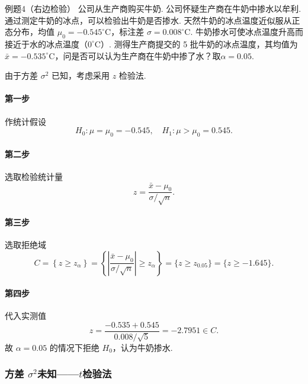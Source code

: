\begin{question}{例题4（右边检验）}
    公司从生产商购买牛奶. 公司怀疑生产商在牛奶中掺水以牟利. 通过测定牛奶的冰点，可以检验出牛奶是否掺水. 天然牛奶的冰点温度近似服从正态分布，均值 $\mu_0=-0.545^\circ\mathrm{C}$，标注差 $\sigma=0.008^\circ\mathrm{C}$. 牛奶掺水可使冰点温度升高而接近于水的冰点温度（$0^\circ\mathrm{C}$）. 测得生产商提交的 5 批牛奶的冰点温度，其均值为 $\bar{x}=-0.535^\circ\mathrm{C}$，问是否可以认为生产商在牛奶中掺了水？取$\alpha=0.05$.
\end{question}
\begin{solution}
    由于方差 $\sigma^2$ 已知，考虑采用 $z$ 检验法.
    \paragraph{第一步} 作统计假设
    $$
        H_0: \mu=\mu_0=-0.545, \quad H_1: \mu>\mu_0=0.545.
    $$
    \paragraph{第二步} 选取检验统计量
    $$
        z = \frac{\bar{x}-\mu_0}{\sigma/\sqrt{n}} .
    $$
    \paragraph{第三步} 选取拒绝域
    $$
        C = \left\{z \geqslant z_{\alpha}\right\}
        = \left\{\left|\frac{\bar{x}-\mu_0}{\sigma/\sqrt{n}}\right| \geqslant z_{\alpha}\right\}
        = \{z \geqslant z_{0.05}\}
        = \{z \geqslant -1.645\}.
    $$
    \paragraph{第四步} 代入实测值
    $$
        z = \frac{-0.535+0.545}{0.008/\sqrt{5}} = -2.7951 \in C.
    $$
    故 $\alpha = 0.05$ 的情况下拒绝 $H_0$，认为牛奶掺水.
\end{solution}


\subsubsection{方差 \texorpdfstring{$\sigma^2$}{σ²}未知——\texorpdfstring{$t$}{t}检验法}

